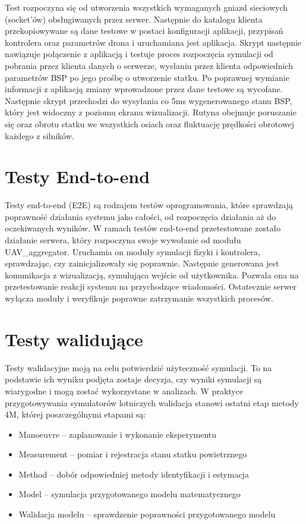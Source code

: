 Test rozpoczyna się od utworzenia wszystkich wymaganych gniazd sieciowych (socket'ów) obsługiwanych przez serwer. Następnie do katalogu klienta przekopiowywane są dane testowe w postaci konfiguracji aplikacji, przypisań kontrolera oraz parametrów drona i uruchamiana jest aplikacja. Skrypt następnie nawiązuje połączenie z aplikacją i testuje proces rozpoczęcia symulacji od pobrania przez klienta danych o serwerze, wysłaniu przez klienta odpowiednich parametrów BSP po jego prośbę o utworzenie statku. Po poprawnej wymianie informacji z aplikacją zmiany wprowadzone przez dane testowe są wycofane. Następnie skrypt przechodzi do wysyłania co 5ms wygenerowanego stanu BSP, który jest widoczny z poziomu ekranu wizualizacji. Rutyna obejmuje poruszanie się oraz obrotu statku we wszystkich osiach oraz fluktuację prędkości obrotowej każdego z silników.  

\section{Testy End-to-end}

Testy end-to-end (E2E) są rodzajem testów oprogramowania, które sprawdzają poprawność działania systemu jako całości, od rozpoczęcia działania aż do oczekiwanych wyników. W ramach testów end-to-end przetestowane zostało działanie serwera, który rozpoczyna swoje wywołanie od modułu UAV\_aggregator. Uruchamia on moduły symulacji fizyki i kontrolera, sprawdzając, czy zainicjalizowały się poprawnie. 
Następnie generowana jest komunikacja z wizualizacją, symulująca wejście od użytkownika. Pozwala ona na przetestowanie reakcji systemu na przychodzące wiadomości.
Ostatecznie serwer wyłącza moduły i weryfikuje poprawne zatrzymanie wszystkich procesów. 

\section{Testy walidujące}

Testy walidacyjne moją na celu potwierdzić użyteczność symulacji. To na podstawie ich wyniku podjęta zostaje decyzja, czy wyniki symulacji są wiarygodne i mogą zostać wykorzystane w analizach. W praktyce przygotowywania symulatorów lotniczych walidacja stanowi ostatni etap metody 4M, której poszczególnymi etapami są:
\begin{itemize}[noitemsep]
\item Manoeuvre -- zaplanowanie i wykonanie eksperymentu
\item Measurement -- pomiar i rejestracja stanu statku powietrznego
\item Method -- dobór odpowiedniej metody identyfikacji i estymacja
\item Model -- symulacja przygotowanego modelu matematycznego
\item Walidacja modelu -- sprawdzenie poprawności przygotowanego modelu
\end{itemize}

